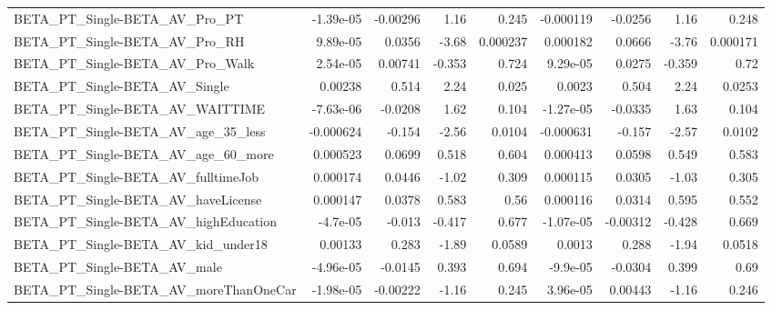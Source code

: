 \begin{tabular}{lrrrrrrrr}
BETA\_PT\_Single-BETA\_AV\_Pro\_PT                      &   -1.39e-05 &     -0.00296 &     1.16 &    0.245 &  -0.000119 &     -0.0256 &         1.16 &         0.248 \\
BETA\_PT\_Single-BETA\_AV\_Pro\_RH                      &    9.89e-05 &       0.0356 &    -3.68 & 0.000237 &   0.000182 &      0.0666 &        -3.76 &      0.000171 \\
BETA\_PT\_Single-BETA\_AV\_Pro\_Walk                    &    2.54e-05 &      0.00741 &   -0.353 &    0.724 &   9.29e-05 &      0.0275 &       -0.359 &          0.72 \\
BETA\_PT\_Single-BETA\_AV\_Single                      &     0.00238 &        0.514 &     2.24 &    0.025 &     0.0023 &       0.504 &         2.24 &        0.0253 \\
BETA\_PT\_Single-BETA\_AV\_WAITTIME                    &   -7.63e-06 &      -0.0208 &     1.62 &    0.104 &  -1.27e-05 &     -0.0335 &         1.63 &         0.104 \\
BETA\_PT\_Single-BETA\_AV\_age\_35\_less                 &   -0.000624 &       -0.154 &    -2.56 &   0.0104 &  -0.000631 &      -0.157 &        -2.57 &        0.0102 \\
BETA\_PT\_Single-BETA\_AV\_age\_60\_more                 &    0.000523 &       0.0699 &    0.518 &    0.604 &   0.000413 &      0.0598 &        0.549 &         0.583 \\
BETA\_PT\_Single-BETA\_AV\_fulltimeJob                 &    0.000174 &       0.0446 &    -1.02 &    0.309 &   0.000115 &      0.0305 &        -1.03 &         0.305 \\
BETA\_PT\_Single-BETA\_AV\_haveLicense                 &    0.000147 &       0.0378 &    0.583 &     0.56 &   0.000116 &      0.0314 &        0.595 &         0.552 \\
BETA\_PT\_Single-BETA\_AV\_highEducation               &    -4.7e-05 &       -0.013 &   -0.417 &    0.677 &  -1.07e-05 &    -0.00312 &       -0.428 &         0.669 \\
BETA\_PT\_Single-BETA\_AV\_kid\_under18                 &     0.00133 &        0.283 &    -1.89 &   0.0589 &     0.0013 &       0.288 &        -1.94 &        0.0518 \\
BETA\_PT\_Single-BETA\_AV\_male                        &   -4.96e-05 &      -0.0145 &    0.393 &    0.694 &   -9.9e-05 &     -0.0304 &        0.399 &          0.69 \\
BETA\_PT\_Single-BETA\_AV\_moreThanOneCar              &   -1.98e-05 &     -0.00222 &    -1.16 &    0.245 &   3.96e-05 &     0.00443 &        -1.16 &         0.246 \\

\end{tabular}
